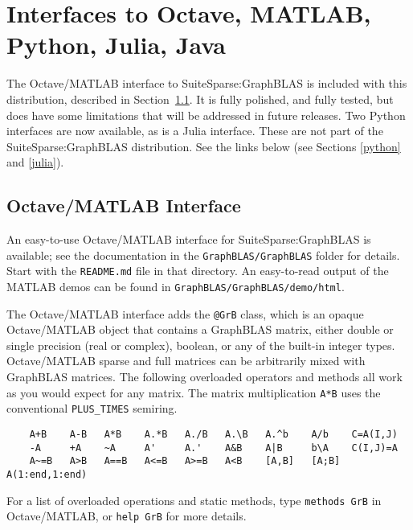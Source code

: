 \documentclass[12pt]{article}
\begin{document}
\section{Interfaces to Octave, MATLAB, Python, Julia, Java} %

The Octave/MATLAB interface to SuiteSparse:GraphBLAS is included with this
distribution, described in Section~\ref{octave}.
It is fully polished, and fully tested, but does have
some limitations that will be addressed in future releases.
Two Python interfaces are now available, as is a
Julia interface.  These are not part of the SuiteSparse:GraphBLAS distribution.
See the links below (see Sections \ref{python} and \ref{julia}).

\subsection{Octave/MATLAB Interface}
\label{octave}

An easy-to-use Octave/MATLAB interface for SuiteSparse:GraphBLAS is available;
see the documentation in the \verb'GraphBLAS/GraphBLAS' folder for details.
Start with the \verb'README.md' file in that directory.  An easy-to-read output
of the MATLAB demos can be found in \verb'GraphBLAS/GraphBLAS/demo/html'.

The Octave/MATLAB interface adds the \verb'@GrB' class, which is an opaque
Octave/MATLAB object that contains a GraphBLAS matrix, either double or single
precision (real or complex), boolean, or any of the built-in integer types.
Octave/MATLAB sparse and full matrices can be arbitrarily mixed with GraphBLAS
matrices.  The following overloaded operators and methods all work as you would
expect for any matrix.  The matrix multiplication \verb'A*B' uses the
conventional \verb'PLUS_TIMES' semiring.

{\footnotesize
\begin{verbatim}
    A+B    A-B   A*B    A.*B   A./B   A.\B   A.^b    A/b    C=A(I,J)
    -A     +A    ~A     A'     A.'    A&B    A|B     b\A    C(I,J)=A
    A~=B   A>B   A==B   A<=B   A>=B   A<B    [A,B]   [A;B]  A(1:end,1:end) \end{verbatim}}

For a list of overloaded operations and static methods, type
\verb'methods GrB' in Octave/MATLAB, or \verb'help GrB' for more details.
\end{document}
